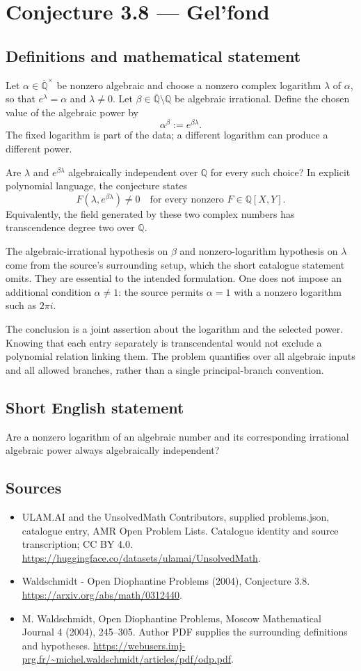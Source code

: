 \documentclass[11pt,a4paper]{article}
\begin{document}
\section*{Conjecture 3.8 — Gel’fond}\label{statement}

\subsection{Definitions and mathematical statement}
Let $\alpha\in\overline{\mathbb Q}^{\times}$ be nonzero algebraic and choose a nonzero complex logarithm $\lambda$ of $\alpha$, so that $e^\lambda=\alpha$ and $\lambda\ne0$. Let $\beta\in\overline{\mathbb Q}\setminus\mathbb Q$ be algebraic irrational. Define the chosen value of the algebraic power by
\[
\alpha^\beta:=e^{\beta\lambda}.
\]
The fixed logarithm is part of the data; a different logarithm can produce a different power.

Are $\lambda$ and $e^{\beta\lambda}$ algebraically independent over $\mathbb Q$ for every such choice? In explicit polynomial language, the conjecture states
\[
F(\lambda,e^{\beta\lambda})\ne0
\quad\text{for every nonzero }F\in\mathbb Q[X,Y].
\]
Equivalently, the field generated by these two complex numbers has transcendence degree two over $\mathbb Q$.

The algebraic-irrational hypothesis on $\beta$ and nonzero-logarithm hypothesis on $\lambda$ come from the source's surrounding setup, which the short catalogue statement omits. They are essential to the intended formulation. One does not impose an additional condition $\alpha\ne1$: the source permits $\alpha=1$ with a nonzero logarithm such as $2\pi i$.

The conclusion is a joint assertion about the logarithm and the selected power. Knowing that each entry separately is transcendental would not exclude a polynomial relation linking them. The problem quantifies over all algebraic inputs and all allowed branches, rather than a single principal-branch convention.
\subsection{Short English statement}
Are a nonzero logarithm of an algebraic number and its corresponding irrational algebraic power always algebraically independent?
\subsection{Sources}
\begin{itemize}
\item[S1] ULAM.AI and the UnsolvedMath Contributors, supplied problems.json, catalogue entry, AMR Open Problem Lists. Catalogue identity and source transcription; CC BY 4.0.
\url{https://huggingface.co/datasets/ulamai/UnsolvedMath}.
\item[S2] Waldschmidt - Open Diophantine Problems (2004), Conjecture 3.8. 
\url{https://arxiv.org/abs/math/0312440}.
\item[S3] M. Waldschmidt, Open Diophantine Problems, Moscow Mathematical Journal 4 (2004), 245–305. Author PDF supplies the surrounding definitions and hypotheses.
\url{https://webusers.imj-prg.fr/~michel.waldschmidt/articles/pdf/odp.pdf}.
\end{itemize}
\end{document}
